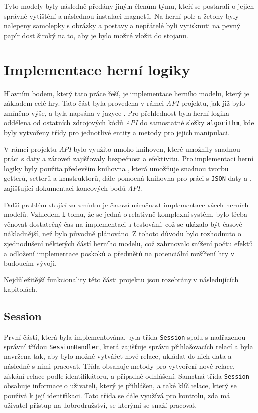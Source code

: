 Tyto modely byly následně předány jiným členům týmu, kteří se postarali o jejich správné vytištění a následnou instalaci magnetů. Na herní pole a žetony byly nalepeny samolepky s obrázky a postavy a nepřátelé byli vytisknuti na pevný papír dost široký na to, aby je bylo možné vložit do stojanu. 

\section{Implementace herní logiky}
\label{sec:game_logic}

Hlavním bodem, který tato práce řeší, je implementace herního modelu, který je základem celé hry. Tato část byla provedena v rámci \textit{API} projektu, jak již bylo zmíněno výše, a byla napsána v jazyce . Pro přehlednost byla herní logika oddělena od ostatních zdrojových kódů \textit{API} do samostatné složky \texttt{algorithm}, kde byly vytvořeny třídy pro jednotlivé entity a metody pro jejich manipulaci.

V rámci projektu \textit{API} bylo využito mnoho knihoven, které umožnily snadnou práci s daty a zároveň zajišťovaly bezpečnost a efektivitu. Pro implementaci herní logiky byly použita především knihovna , která umožňuje snadnou tvorbu getterů, setterů a konstruktorů, dále pomocná knihovna  pro práci s \texttt{JSON} daty a , zajišťující dokumentaci koncových bodů \textit{API}.

Další problém stojící za zmínku je časová náročnost implementace všech herních modelů. Vzhledem k tomu, že se jedná o relativně komplexní systém, bylo třeba věnovat dostatečný čas na implementaci a testování, což se ukázalo být časově nákladnější, než bylo původně plánováno. Z tohoto důvodu bylo rozhodnuto o zjednodušení některých částí herního modelu, což zahrnovalo snížení počtu efektů a odložení implementace poskoků a předmětů na potenciální rozšíření hry v budoucím vývoji.

Nejdůležitější funkcionality této části projektu jsou rozebrány v následujících kapitolách.

\subsection{Session}
\label{subsec:impl_session}

První částí, která byla implementována, byla třída \texttt{Session} spolu s nadřazenou správní třídou \texttt{SessionHandler}, která zajišťuje správu přihlašovacích relací a byla navržena tak, aby bylo možné vytvářet nové relace, ukládat do nich data a následně s nimi pracovat. Třída obsahuje metody pro vytvoření nové relace, získání relace podle identifikátoru, a případné odhlášení. Samotná třída \texttt{Session} obsahuje informace o uživateli, který je přihlášen, a také klíč relace, který se používá k její identifikaci. Tato třída se dále využívá pro kontrolu, zda má uživatel přístup na dobrodružství, se kterými se snaží pracovat.


